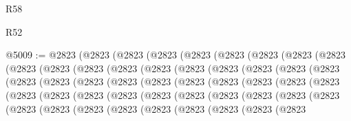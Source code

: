 \begin{lexlean}{R58}
\begin{lexlean}{R52}
\begin{coremodule}
{{{{{{{{{{{{{{{{{{{{{{{{{{{{{{{{{{{{{{{{{{{{{{{{{{{{{{{{{{{{{{{{{{{{{{{{{{{{{{{{{{{{{{{{{{{{{{{{{{{{{{{{{{{{{{{{{{{{{{{{{{{{{{{{{{{{{{{{{{{{{{{{{{{{{{{{{{{{{{{{{{{{{{{{{{{{{{{{{{{{{{{{{{{{{{{{{{{{{{@5009 := @2823
    (@2823
      (@2823
        (@2823
          (@2823
            (@2823
              (@2823
                (@2823
                  (@2823
                    (@2823
                      (@2823
                        (@2823
                          (@2823
                            (@2823
                              (@2823
                                (@2823
                                  (@2823
                                    (@2823
                                      (@2823
                                        (@2823
                                          (@2823
                                            (@2823
                                              (@2823
                                                (@2823
                                                  (@2823
                                                    (@2823
                                                      (@2823
                                                        (@2823
                                                          (@2823
                                                            (@2823
                                                              (@2823
                                                                (@2823
                                                                  (@2823
                                                                    (@2823
                                                                      (@2823
                                                                        (@2823
                                                                          (@2823
                                                                            (@2823
                                                                              (@2823
                                                                                (@2823
                                                                                  (@2823
                                                                                    (@2823
                                                                                      (@2823
                                                                                        (@2823
                                                                                          (@2823
                                                                                            (@2823
                                                                                              (@2823
                                                                                                (@2823
}}}}}}}}}}}}}}}}}}}}}}}}}}}}}}}}}}}}}}}}}}}}}}}}}}}}}}}}}}}}}}}}}}}}}}}}}}}}}}}}}}}}}}}}}}}}}}}}}}}}}}}}}}}}}}}}}}}}}}}}}}}}}}}}}}}}}}}}}}}}}}}}}}}}}}}}}}}}}}}}}}}}}}}}}}}}}}}}}}}}}}}}}}}}}}}}}}}}}}
\end{coremodule}
\end{lexlean}
\end{lexlean}
